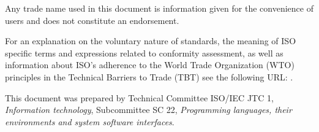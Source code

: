 Any trade name used in this document is information given for the convenience
of users and does not constitute an endorsement.

For an explanation on
the voluntary nature of standards,
the meaning of ISO specific terms and expressions related
to conformity assessment, as well as information about ISO's adherence
to the World Trade Organization (WTO) principles
in the Technical Barriers to Trade (TBT) see the following URL:
\href{http://www.iso.org/iso/foreword.html}{}.

This document was prepared by Technical Committee ISO/IEC JTC 1, \textit{Information technology}, Subcommittee SC 22, \textit{Programming languages, their environments and system software interfaces}.
